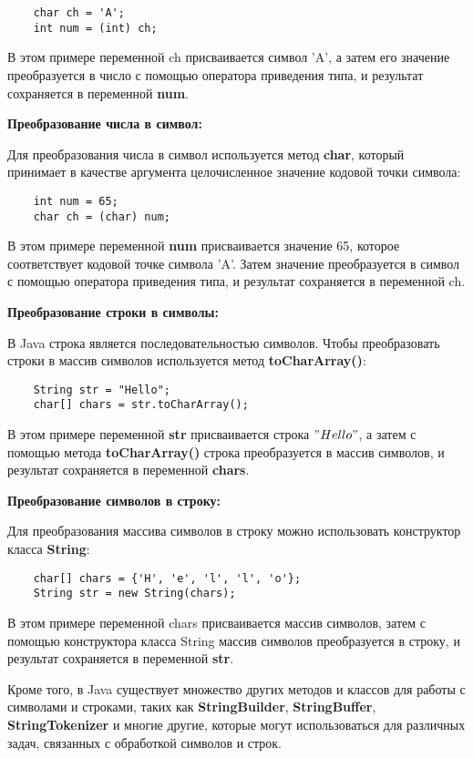 \documentclass[12pt, a4paper]{book}%
\begin{document}
{\begin{lstlisting}
    char ch = 'A';
    int num = (int) ch;
\end{lstlisting}

В этом примере переменной ch присваивается символ 'A', а затем его значение преобразуется в число с помощью оператора приведения типа, и результат сохраняется в переменной {\bf num}.

{\bf Преобразование числа в символ:}

Для преобразования числа в символ используется метод {\bf char}, который принимает в качестве аргумента целочисленное значение кодовой точки символа:

\begin{lstlisting}
    int num = 65;
    char ch = (char) num;
\end{lstlisting}

В этом примере переменной {\bf num} присваивается значение 65, которое соответствует кодовой точке символа 'A'. Затем значение преобразуется в символ с помощью оператора приведения типа, и результат сохраняется в переменной ch.

{\bf Преобразование строки в символы:}

В Java строка является последовательностью символов. Чтобы преобразовать строки в массив символов используется метод {\bf toCharArray()}:

\begin{lstlisting}
    String str = "Hello";
    char[] chars = str.toCharArray();
\end{lstlisting}

В этом примере переменной {\bf str} присваивается строка $"Hello"$, а затем с помощью метода {\bf toCharArray()} строка преобразуется в массив символов, и результат сохраняется в переменной {\bf chars}.

{\bf Преобразование символов в строку:}

Для преобразования массива символов в строку можно использовать конструктор класса {\bf String}:

\begin{lstlisting}
    char[] chars = {'H', 'e', 'l', 'l', 'o'};
    String str = new String(chars);
\end{lstlisting}

В этом примере переменной chars присваивается массив символов, затем с помощью конструктора класса String массив символов преобразуется в строку, и результат сохраняется в переменной {\bf str}.

Кроме того, в Java существует множество других методов и классов для работы с символами и строками, таких как {\bf StringBuilder}, {\bf StringBuffer}, {\bf StringTokenizer} и многие другие, которые могут использоваться для различных задач, связанных с обработкой символов и строк.

}
\end{document}
